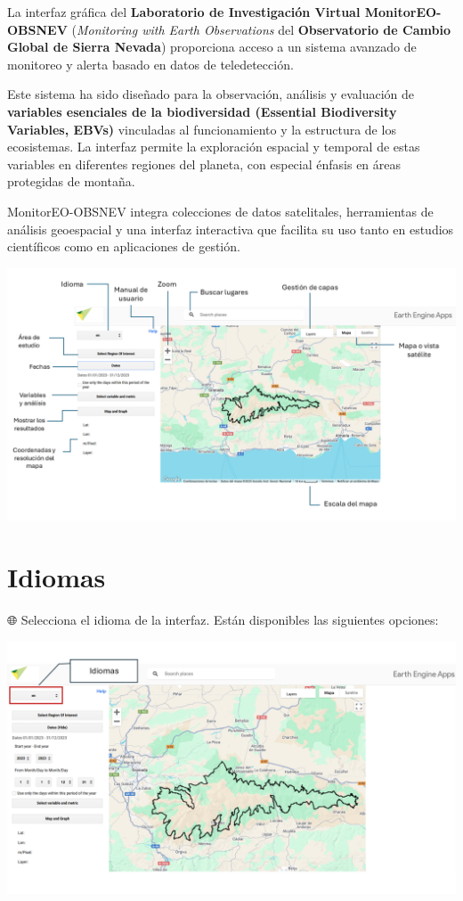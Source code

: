 \documentclass[
]{book}
\begin{document}
La interfaz gráfica del \textbf{Laboratorio de Investigación Virtual MonitorEO-OBSNEV} (\emph{Monitoring with Earth Observations} del \textbf{Observatorio de Cambio Global de Sierra Nevada}) proporciona acceso a un sistema avanzado de monitoreo y alerta basado en datos de teledetección.

Este sistema ha sido diseñado para la observación, análisis y evaluación de \textbf{variables esenciales de la biodiversidad (Essential Biodiversity Variables, EBVs)} vinculadas al funcionamiento y la estructura de los ecosistemas. La interfaz permite la exploración espacial y temporal de estas variables en diferentes regiones del planeta, con especial énfasis en áreas protegidas de montaña.

MonitorEO-OBSNEV integra colecciones de datos satelitales, herramientas de análisis geoespacial y una interfaz interactiva que facilita su uso tanto en estudios científicos como en aplicaciones de gestión.

\includegraphics{assets/InterfazMonitorEO_es.png}

\chapter{Idiomas}\label{idiomas}

🌐 Selecciona el idioma de la interfaz. Están disponibles las siguientes opciones:

\includegraphics{assets/Idiomas.png}
\end{document}
